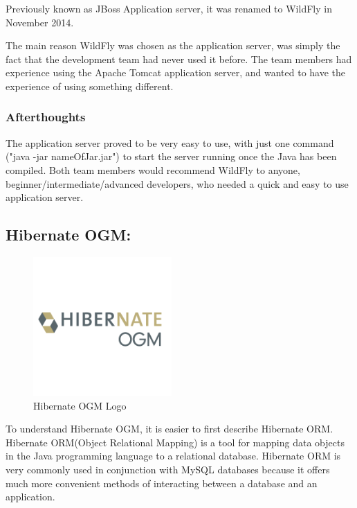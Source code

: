 Previously known as JBoss Application server, it was renamed to WildFly in November 2014. 

\bigskip

The main reason WildFly was chosen as the application server, was simply the fact that the development team had never used it before. The team members had experience using the Apache Tomcat application server, and wanted to have the experience of using something different.

\subsubsection{Afterthoughts}
The application server proved to be very easy to use, with just one command ("java -jar nameOfJar.jar") to start the server running once the Java has been compiled. Both team members would recommend WildFly to anyone, beginner/intermediate/advanced developers, who needed a quick and easy to use application server.



\subsection{Hibernate OGM:}
\label{sec:TechnologyReviewHibernate}
\begin{figure}[H]
    \centering
    \includegraphics[width=\textwidth, height=150pt]{img/HibernateOGMLogo.png}
    \caption{Hibernate OGM Logo}
    \label{fig:my_label}
\end{figure}
To understand Hibernate OGM, it is easier to first describe Hibernate ORM. Hibernate ORM(Object Relational Mapping) is a tool for mapping data objects in the Java programming language to a relational database. Hibernate ORM is very commonly used in conjunction with MySQL databases because it offers much more convenient methods of interacting between a database and an application. 

